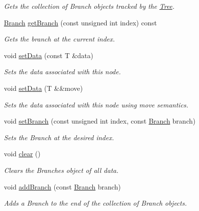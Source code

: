 \begin{DoxyCompactItemize}
\begin{DoxyCompactList}\small\item\em Gets the collection of Branch objects tracked by the \hyperlink{classTree}{Tree}. \end{DoxyCompactList}\item 
\hyperlink{classTree_a9acb980cd198358d57fb2a6e5d65c85b}{Branch} \hyperlink{classTree_a3f6b272bfa9033ebad14879e520bf332}{get\+Branch} (const unsigned int index) const 
\begin{DoxyCompactList}\small\item\em Gets the branch at the current index. \end{DoxyCompactList}\item 
void \hyperlink{classTree_a47964b5ec65514701fbfed08815cece6}{set\+Data} (const T \&data)
\begin{DoxyCompactList}\small\item\em Sets the data associated with this node. \end{DoxyCompactList}\item 
void \hyperlink{classTree_a6491ed9ecd60487ccddcd20b3af9a1da}{set\+Data} (T \&\&move)
\begin{DoxyCompactList}\small\item\em Sets the data associated with this node using move semantics. \end{DoxyCompactList}\item 
void \hyperlink{classTree_a43b5e9145fa35634d0e67f048f69a01e}{set\+Branch} (const unsigned int index, const \hyperlink{classTree_a9acb980cd198358d57fb2a6e5d65c85b}{Branch} branch)
\begin{DoxyCompactList}\small\item\em Sets the Branch at the desired index. \end{DoxyCompactList}\item 
void \hyperlink{classTree_ad6d4b3f4b3584e1ef34d688b350da2ad}{clear} ()
\begin{DoxyCompactList}\small\item\em Clears the Branches object of all data. \end{DoxyCompactList}\item 
void \hyperlink{classTree_ae583fa1ebe0d58b4a94bc351add90dff}{add\+Branch} (const \hyperlink{classTree_a9acb980cd198358d57fb2a6e5d65c85b}{Branch} branch)
\begin{DoxyCompactList}\small\item\em Adds a Branch to the end of the collection of Branch objects. \end{DoxyCompactList}\item 

\end{DoxyCompactItemize}
